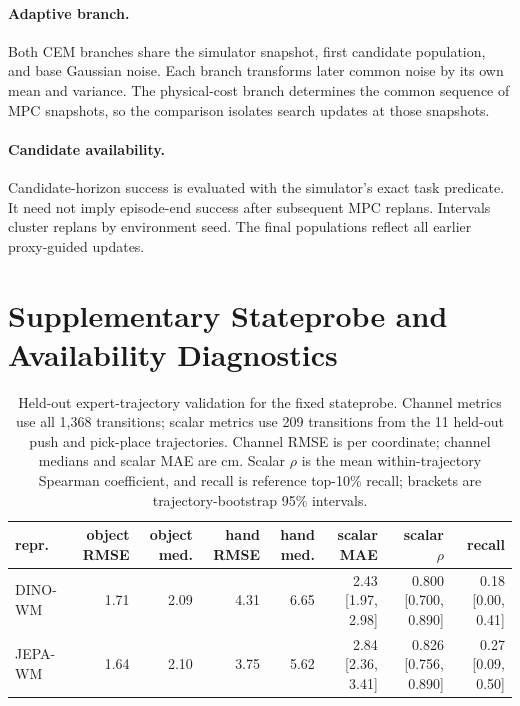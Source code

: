 \documentclass[10pt]{article}
\begin{document}
\paragraph{Adaptive branch.}
Both CEM branches share the simulator snapshot, first candidate population,
and base Gaussian noise. Each branch transforms later common noise by its own
mean and variance. The physical-cost branch determines the common sequence of
MPC snapshots, so the comparison isolates search updates at those snapshots.

\paragraph{Candidate availability.}
Candidate-horizon success is evaluated with the simulator's exact task
predicate. It need not imply episode-end success after subsequent MPC replans.
Intervals cluster replans by environment seed. The final populations reflect
all earlier proxy-guided updates.

\section{Supplementary Stateprobe and Availability Diagnostics}
\label{app:selection}

\begin{table}[ht]
\centering
\scriptsize
\setlength{\tabcolsep}{2.5pt}
\caption{Held-out expert-trajectory validation for the fixed stateprobe.
Channel metrics use all 1,368 transitions; scalar metrics use 209 transitions
from the 11 held-out push and pick-place trajectories. Channel RMSE is per
coordinate; channel medians and scalar MAE are cm. Scalar $\rho$ is the mean
within-trajectory Spearman coefficient, and recall is reference top-10\%
recall; brackets are trajectory-bootstrap 95\% intervals.}
\label{tab:probeexpertmain}
\begin{tabular}{lrrrrrrr}
\toprule
repr. & object RMSE & object med. & hand RMSE & hand med. & scalar MAE & scalar $\rho$ & recall \\
\midrule
DINO-WM & 1.71 & 2.09 & 4.31 & 6.65 & 2.43 [1.97, 2.98] & 0.800 [0.700, 0.890] & 0.18 [0.00, 0.41] \\
JEPA-WM & 1.64 & 2.10 & 3.75 & 5.62 & 2.84 [2.36, 3.41] & 0.826 [0.756, 0.890] & 0.27 [0.09, 0.50] \\
\bottomrule
\end{tabular}
\end{table}
\end{document}
